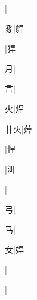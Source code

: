 \begin{multicols}{2}
{{}|{}\par
{\cjk{}{\cnsym{}　}{\cnsym{}　}豸}|{\cjk{}貋}\par
{}|{\cjk{}猂}\par
{\cjk{}{\cnsym{}　}{\cnsym{}　}月}|{}\par
{\cjk{}{\cnsym{}　}{\cnsym{}　}言}|{}\par
{\cjk{}{\cnsym{}　}{\cnsym{}　}火}|{\cjk{}焊}\par
{\cjk{}{\cnsym{}　}卄火}|{\cjk{}蔊}\par
{}|{\cjk{}悍}\par
{}|{\cjk{}涆}\par
{}|{}\par
{\cjk{}{\cnsym{}　}{\cnsym{}　}弓}|{}\par
{\cjk{}{\cnsym{}　}{\cnsym{}　}马}|{}\par
{\cjk{}{\cnsym{}　}{\cnsym{}　}女}|{\cjk{}娨}\par
{\cjk{}{\cnsym{}　}{\cnsym{}　}{\cnsym{}　}}|{}\par
{\cjk{}{\cnsym{}　}{\cnsym{}　}{\cnsym{}　}}|{}\par
}
\end{multicols}
